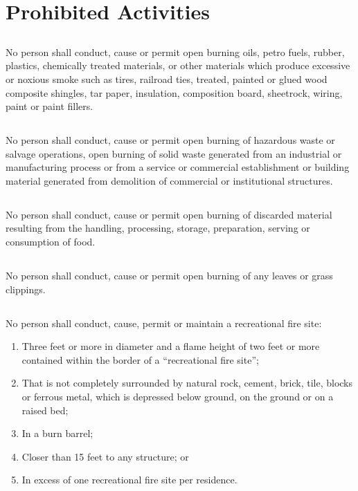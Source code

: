 \section{Prohibited Activities}
\subsection{}
No person shall conduct, cause or permit open burning oils, petro fuels, rubber, plastics, chemically treated materials, or other materials which produce excessive or noxious smoke such as tires, railroad ties, treated, painted or glued wood composite shingles, tar paper, insulation, composition board, sheetrock, wiring, paint or paint fillers.
\subsection{}
No person shall conduct, cause or permit open burning of hazardous waste or salvage operations, open burning of solid waste generated from an industrial or manufacturing process or from a service or commercial establishment or building material generated from demolition of commercial or institutional structures.
\subsection{}
No person shall conduct, cause or permit open burning of discarded material resulting from the handling, processing, storage, preparation, serving or consumption of food.
\subsection{}
No person shall conduct, cause or permit open burning of any leaves or grass clippings.
\subsection{}
No person shall conduct, cause, permit or maintain a recreational fire site:
\begin{enumerate}[{\indent}1)]
    \item Three feet or more in diameter and a flame height of two feet or more contained within the border of a “recreational fire site”;
    \item That is not completely surrounded by natural rock, cement, brick, tile, blocks or ferrous metal, which is depressed below ground, on the ground or on a raised bed;
    \item In a burn barrel;
    \item Closer than 15 feet to any structure; or
    \item In excess of one recreational fire site per residence.
\end{enumerate}
